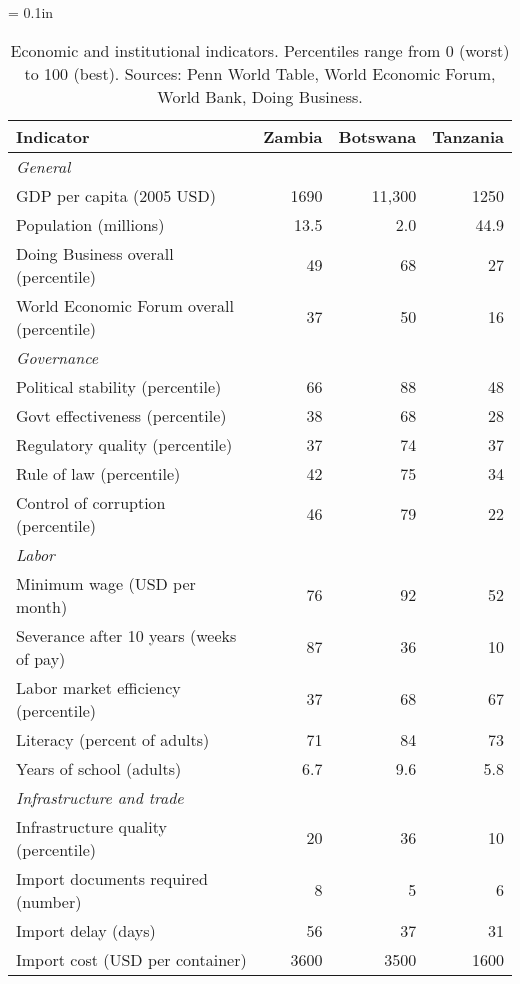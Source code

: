 \documentclass[12pt]{article}
\begin{document}
\begin{table}[h]
\centering
\tabcolsep = 0.1in
\begin{tabular}{lrrr}
\toprule
Indicator & Zambia &  Botswana & Tanzania \\
\midrule
\multicolumn{2}{l}{\it General} \\
GDP per capita  (2005 USD) &  1690  & 11,300 & 1250  \\
Population (millions)      &   13.5 & 2.0 &  44.9   \\
Doing Business overall (percentile) & 49  & 68 & 27 \\
World Economic Forum overall (percentile) & 37 & 50 & 16\\
\midrule
\multicolumn{2}{l}{\it Governance} \\
Political stability (percentile)  &  66 & 88 & 48 \\
Govt effectiveness (percentile)   &  38 & 68 & 28 \\
Regulatory quality (percentile)   &  37 & 74 & 37 \\
Rule of law (percentile)          &  42 & 75 & 34 \\
Control of corruption (percentile)&  46 & 79 & 22 \\
\midrule
\multicolumn{2}{l}{\it Labor} \\
Minimum wage (USD per month) &   76 & 92 & 52 \\
Severance after 10 years (weeks of pay) & 87 & 36 & 10 \\
Labor market efficiency (percentile) & 37 & 68 & 67  \\
Literacy (percent of adults)        & 71 & 84 & 73 \\
Years of school (adults)        & 6.7 & 9.6 & 5.8  \\
\midrule
\multicolumn{2}{l}{\it Infrastructure and trade} \\
Infrastructure quality (percentile)  & 20 & 36 & 10 \\
Import documents required (number) & 8 & 5 & 6\\
Import delay (days) &  56 & 37 & 31  \\
Import cost (USD per container) &  3600 & 3500 & 1600 \\
\bottomrule
\end{tabular}
\caption{Economic and institutional indicators.
Percentiles range from 0 (worst) to 100 (best).
Sources:  Penn World Table, World Economic Forum, World Bank, Doing Business.}
\label{tab:zambia}
\end{table}
\end{document}
